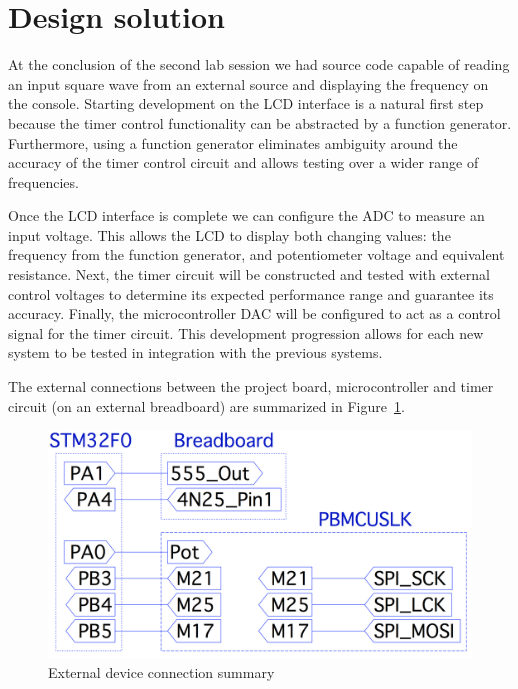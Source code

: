 \section{Design solution}\label{sec:design-soln}


At the conclusion of the second lab session we had source code capable of reading an input square wave from an external source and displaying the frequency on the console.
Starting development on the LCD interface is a natural first step because the timer control functionality can be abstracted by a function generator.
Furthermore, using a function generator eliminates ambiguity around the accuracy of the timer control circuit and allows testing over a wider range of frequencies.

Once the LCD interface is complete we can configure the ADC to measure an input voltage.
This allows the LCD to display both changing values: the frequency from the function generator, and potentiometer voltage and equivalent resistance.
Next, the timer circuit will be constructed and tested with external control voltages to determine its expected performance range and guarantee its accuracy.
Finally, the microcontroller DAC will be configured to act as a control signal for the timer circuit.
This development progression allows for each new system to be tested in integration with the previous systems.

The external connections between the project board, microcontroller and timer circuit (on an external breadboard) are summarized in Figure~\ref{fig:schematic_uc-to-project-board}.

\begin{figure}[tbph]
  \centering
  \includegraphics[width=0.7\linewidth]{../graphics/schematic_uc-to-project-board}
  \caption{External device connection summary}
  \label{fig:schematic_uc-to-project-board}
\end{figure}

